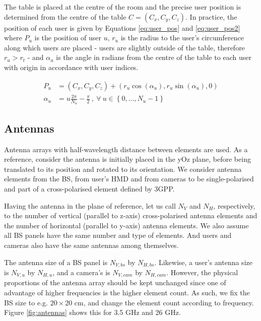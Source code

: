 \vspace{.6cm}

The table is placed at the centre of the room and the precise user position is determined from the centre of the table $C = (C_x, C_y, C_z)$. In practice, the position of each user is given by Equations \eqref{eq:user_pos} and \eqref{eq:user_pos2} where $P_u$ is the position of user $u$, $r_u$ is the radius to the user's circumference along which users are placed - users are slightly outside of the table, therefore $r_u > r_t$ - and $\alpha_u$ is the angle in radians from the centre of the table to each user with origin in accordance with user indices. 

\begin{align} 
    P_u &= (C_x, C_y, C_z) + (r_u \cos(\alpha_u), r_u \sin(\alpha_u), 0) \label{eq:user_pos} \\
    \alpha_u &= u  \frac{2 \pi}{N_u} - \frac{\pi}{2} \ , \ \forall \ u \in \left\{0, ..., N_u - 1\right\} \label{eq:user_pos2}
\end{align}

\subsection{Antennas}

Antenna arrays with half-wavelength distance between elements are used. As a reference, consider the antenna is initially placed in the yOz plane, before being translated to its position and rotated to its orientation. We consider antenna elements from the \ac{BS}, from user's \ac{HMD} and from cameras to be single-polarised and part of a cross-polarised element defined by 3GPP. 

Having the antenna in the plane of reference, let us call $N_V$ and $N_H$, respectively, to the number of vertical (parallel to z-axis) cross-polarised antenna elements and the number of horizontal (parallel to y-axis) antenna elements. We also assume all BS panels have the same number and type of elements. And users and cameras also have the same antennas among themselves. 

The antenna size of a \ac{BS} panel is $N_{V,bs}$ by $N_{H,bs}$. Likewise, a user's antenna size is $N_{V,u}$ by $N_{H,u}$, and a camera's is $N_{V,cam}$ by $N_{H,cam}$. However, the physical proportions of the antenna array should be kept unchanged since one of advantage of higher frequencies is the higher element count. As such, we fix the BS size to e.g. $20 \times 20$ cm, and change the element count according to frequency. Figure \ref{fig:antennas} shows this for 3.5 GHz and 26 GHz.


